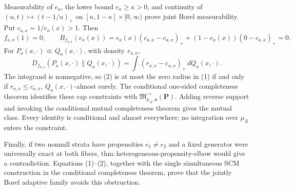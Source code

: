 Measurability of \(e_a\), the lower bound \(e_a\ge\kappa>0\), and continuity of \((u,t)\mapsto(t-1/u)_+\) on \([\kappa,1-\kappa]\times[0,\infty)\) prove joint Borel measurability.  Put \(c_{a,x}=1/e_a(x)>1\).  Then
\[
 f_{a,x}(1)=0,
 \qquad
 B_{f_{a,x}}(e_a(x))
 =e_a(x)(c_{a,x}-c_{a,x})_+
 +(1-e_a(x))(0-c_{a,x})_+=0. \tag{1}
\]
For \(P_a(x,\cdot)\ll Q_a(x,\cdot)\), with density \(r_{a,x}\),
\[
 D_{f_{a,x}}(P_a(x,\cdot)\|Q_a(x,\cdot))
 =\int (r_{a,x}-c_{a,x})_+\,dQ_a(x,\cdot). \tag{2}
\]
The integrand is nonnegative, so (2) is at most the zero radius in (1) if and only if \(r_{a,x}\le c_{a,x}\), \(Q_a(x,\cdot)\)-almost surely.  The conditional one-sided completeness theorem identifies these cap constraints with \(\mathfrak M^{\to}_{\mu_X,\boldsymbol e}(\boldsymbol P)\).  Adding reverse support and invoking the conditional mutual completeness theorem gives the mutual class.  Every identity is conditional and almost everywhere; no integration over \(\mu_X\) enters the constraint.

Finally, if two nonnull strata have propensities \(e_1\ne e_2\) and a fixed generator were universally exact at both fibers, \(\mathrm{thm:heterogeneous\text{-}propensity\text{-}elbow}\) would give a contradiction.  Equations (1)--(2), together with the single simultaneous SCM construction in the conditional completeness theorem, prove that the jointly Borel adaptive family avoids this obstruction.